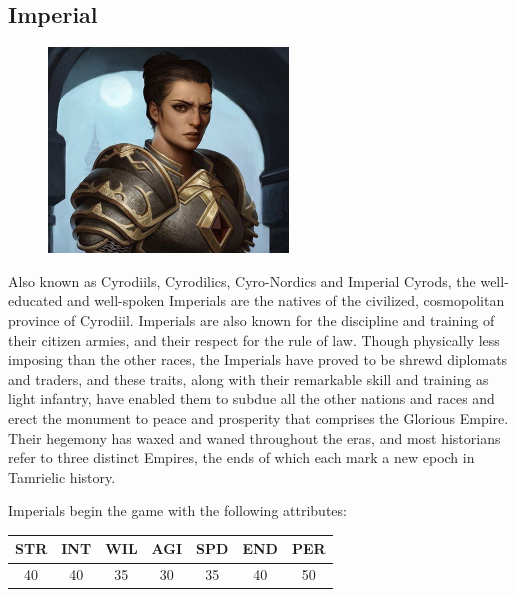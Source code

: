 \documentclass[12pt]{book}
\begin{document}
\subsection{Imperial}
\begin{figure}
	\includegraphics[width=\textwidth]{Imperial.png}
\end{figure}

Also known as Cyrodiils, Cyrodilics, Cyro-Nordics and Imperial Cyrods, the well-educated and well-spoken Imperials are the natives of the civilized, cosmopolitan province of Cyrodiil. Imperials are also known for the discipline and training of their citizen armies, and their respect for the rule of law. Though physically less imposing than the other races, the Imperials have proved to be shrewd diplomats and traders, and these traits, along with their remarkable skill and training as light infantry, have enabled them to subdue all the other nations and races and erect the monument to peace and prosperity that comprises the Glorious Empire. Their hegemony has waxed and waned throughout the eras, and most historians refer to three distinct Empires, the ends of which each mark a new epoch in Tamrielic history.

Imperials begin the game with the following attributes:
\begin{center}
\begin{tabular}{|c|c|c|c|c|c|c|}
\hline
STR & INT & WIL & AGI & SPD & END & PER\\ \hline
40 & 40 & 35 & 30 & 35 & 40 & 50\\ \hline
\end{tabular}
\end{center}
\end{document}
